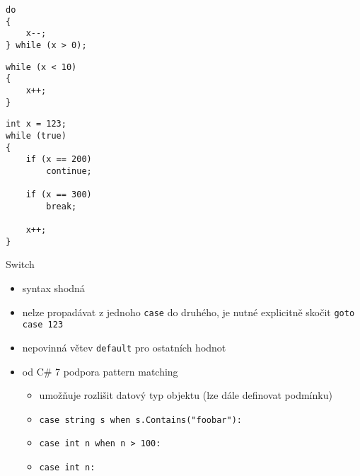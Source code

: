 \begin{frame}[fragile]
\begin{yesblock}
\begin{lstlisting}
do
{
    x--;
} while (x > 0);
\end{lstlisting}
\end{yesblock}

\begin{yesblock}
\begin{lstlisting}
while (x < 10)
{
    x++;
}
\end{lstlisting}
\end{yesblock}
\end{frame}




\begin{frame}[fragile]
\begin{yesblock}
\begin{lstlisting}
int x = 123;
while (true)
{
    if (x == 200)
        continue;

    if (x == 300)
        break;
    
    x++;
}
\end{lstlisting}
\end{yesblock}
\end{frame}





\begin{frame}[fragile]
\begin{block}{Switch}
\begin{itemize}
\item syntax shodná
\item nelze propadávat z jednoho \lstinline|case| do druhého, je nutné explicitně skočit \lstinline|goto case 123|
\item nepovinná větev \lstinline|default| pro ostatních hodnot
\end{itemize}
\end{block}

\begin{bonusblock}{}
\begin{itemize}
\item od C\# 7 podpora pattern matching
\begin{itemize}
\item umožňuje rozlišit datový typ objektu (lze dále definovat podmínku)
\item \lstinline|case string s when s.Contains("foobar"):|
\item \lstinline|case int n when n > 100:|
\item \lstinline|case int n:|
\end{itemize}
\end{itemize}
\end{bonusblock}
\end{frame}





